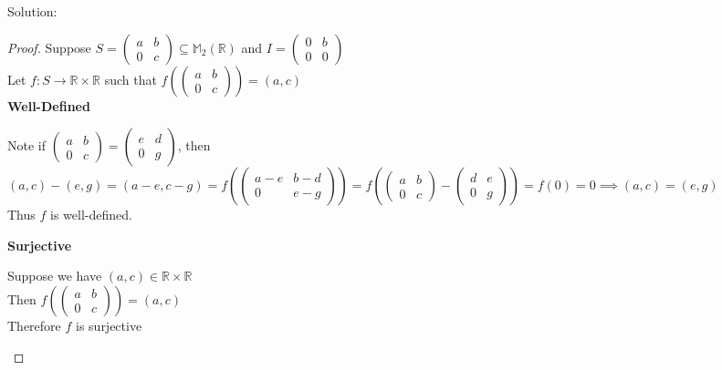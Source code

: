 \documentclass{article} %
\begin{document}
Solution: 
\begin{addmargin}[1em]{0em}
\begin{proof}
Suppose $S = \left( \begin{matrix} a & b \\ 0 & c \end{matrix} \right) \subseteq \mathbb{M}_2(\mathbb{R})$ and $I = \left( \begin{matrix} 0 & b \\ 0 & 0 \end{matrix} \right)$
\\Let $f: S \rightarrow \mathbb{R} \times \mathbb{R}$ such that $f( \left( \begin{matrix} a & b \\ 0 & c \end{matrix} \right) ) = (a,c)$
\\ \textbf{Well-Defined}
\begin{addmargin}[1em]{0em}
Note if $\left( \begin{matrix} a & b \\ 0 & c \end{matrix} \right) = \left( \begin{matrix} e & d \\ 0 & g \end{matrix} \right)$, then $(a,c) - (e,g) = (a-e,c-g) = f( \left( \begin{matrix} a-e & b - d \\ 0 & e - g \end{matrix} \right) ) = f(\left( \begin{matrix} a & b \\ 0 & c \end{matrix} \right) - \left( \begin{matrix} d & e \\ 0 & g \end{matrix}\right)) = f(0) = 0 \implies (a,c) = (e,g)$
\\Thus $f$ is well-defined.
\end{addmargin}
\textbf{Surjective}
\begin{addmargin}[1em]{0em}
Suppose we have $(a,c) \in \mathbb{R} \times \mathbb{R}$
\\Then $f( \left( \begin{matrix} a & b \\ 0 & c \end{matrix} \right) ) = (a,c)$
\\Therefore $f$ is surjective
\end{addmargin}

\end{proof}
\end{addmargin}
\end{document}
